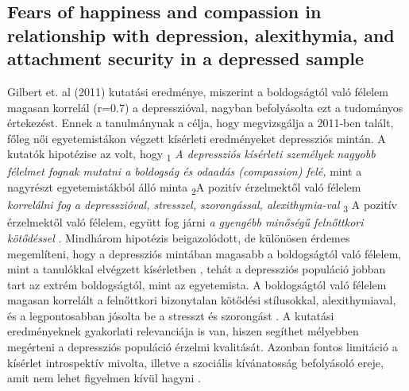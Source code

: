 \subsection{Fears of happiness and compassion in relationship
	with depression, alexithymia, and attachment
	security in a depressed sample \cite{gilbert_mcewan_catarino_baiao_palmeira_2013}}
Gilbert et. al (2011) kutatási eredménye, miszerint a boldogságtól való félelem magasan korrelál (r=0.7) a depresszióval, nagyban befolyásolta ezt a tudományos értekezést. Ennek a tanulmánynak a célja, hogy megvizsgálja a 2011-ben talált, főleg női egyetemistákon végzett kísérleti eredményeket depressziós mintán. A kutatók hipotézise az volt,  hogy \textsubscript{1} \textit{ A depressziós kísérleti személyek nagyobb félelmet fognak mutatni a boldogság és odaadás (compassion) felé,}  mint a nagyrészt egyetemis\-tákból álló minta \textsubscript{2}A pozitív érzelmektől való félelem \textit{korrelálni fog a depresszióval, stresszel, szorongással, alexithymia-val }   \textsubscript{3} A pozitív érzelmektől való félelem, együtt fog járni \textit{a gyengébb minőségű felnőttkori kötődéssel} \cite{gilbert_mcewan_catarino_baiao_palmeira_2013}. Mindhárom hipotézis beigazolódott, de különösen érdemes megemlíteni, hogy a depressziós mintában magasabb a boldogságtól való félelem, mint a tanulókkal elvégzett kísérletben \cite{gilbert_mcewan_gibbons_chotai_duarte_matos_2011}, tehát a depressziós populáció jobban tart az extrém boldogságtól, mint az egyetemista. A boldogságtól való félelem magasan korrelált a felnőttkori bizonytalan kötődési stílusokkal, alexithymiaval, és a legpontosabban jósolta be a stresszt és szorongást \cite{gilbert_mcewan_catarino_baiao_palmeira_2013}. A kutatási eredményeknek gyakorlati relevanciája is van, hiszen segíthet mélyebben megérteni a depressziós populáció érzelmi kvalitását. Azonban fontos limitáció a kísérlet introspektív mivolta, illetve a szociális kívánatosság befolyásoló ereje, amit nem lehet figyelmen kívül hagyni \cite{gilbert_mcewan_catarino_baiao_palmeira_2013}.


